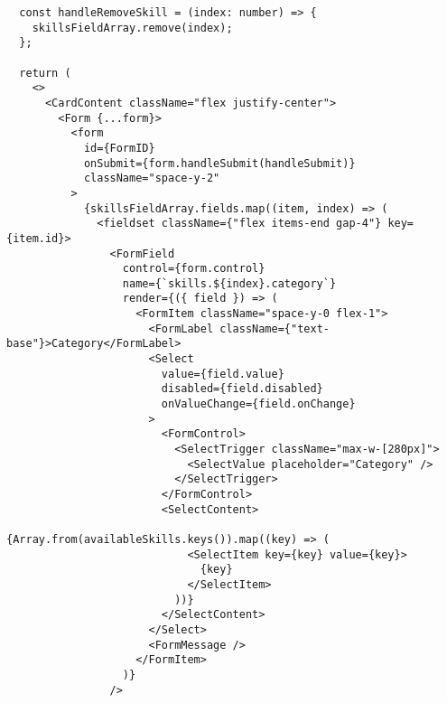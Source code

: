 \begin{verbatim}
  const handleRemoveSkill = (index: number) => {
    skillsFieldArray.remove(index);
  };

  return (
    <>
      <CardContent className="flex justify-center">
        <Form {...form}>
          <form
            id={FormID}
            onSubmit={form.handleSubmit(handleSubmit)}
            className="space-y-2"
          >
            {skillsFieldArray.fields.map((item, index) => (
              <fieldset className={"flex items-end gap-4"} key={item.id}>
                <FormField
                  control={form.control}
                  name={`skills.${index}.category`}
                  render={({ field }) => (
                    <FormItem className="space-y-0 flex-1">
                      <FormLabel className={"text-base"}>Category</FormLabel>
                      <Select
                        value={field.value}
                        disabled={field.disabled}
                        onValueChange={field.onChange}
                      >
                        <FormControl>
                          <SelectTrigger className="max-w-[280px]">
                            <SelectValue placeholder="Category" />
                          </SelectTrigger>
                        </FormControl>
                        <SelectContent>
                          {Array.from(availableSkills.keys()).map((key) => (
                            <SelectItem key={key} value={key}>
                              {key}
                            </SelectItem>
                          ))}
                        </SelectContent>
                      </Select>
                      <FormMessage />
                    </FormItem>
                  )}
                />


\end{verbatim}
